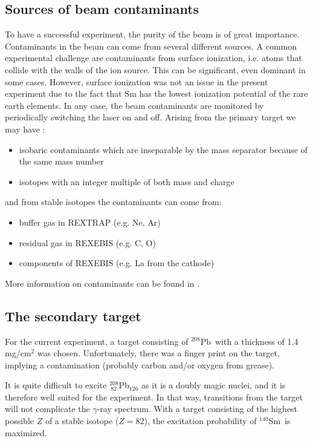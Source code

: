 \documentclass[twoside,english]{uiofysmaster/uiofysmaster}
\newcommand{\Sm}{$^{140}$Sm} %
\newcommand{\Pb}{$^{208}$Pb}
\newcommand{\ga}{$\gamma$}
\begin{document}
\subsection{Sources of beam contaminants}\label{ssec:bcontaminants}
To have a successful experiment, the purity of the beam is of great importance. Contaminants in the beam can come from several different sources. 
A common experimental challenge are contaminants from surface ionization, i.e. atoms that collide with the walls of the ion source. 
This can be significant, even dominant in some cases. 
However, surface ionization was not an issue in the present experiment due to the fact that Sm has the lowest ionization potential of the rare earth elements. 
In any case, the beam contaminants are monitored by periodically switching the laser on and off.
Arising from the primary target we may have \cite{MB-spect}:
\begin{itemize}
	\item isobaric contaminants which are inseparable by the mass separator because of the same mass number
	\item isotopes with an integer multiple of both mass and charge
\end{itemize}
and from stable isotopes the contaminants can come from:
\begin{itemize}
	\item buffer gas in REXTRAP (e.g. Ne, Ar)
	\item residual gas in REXEBIS (e.g. C, O)
	\item components of REXEBIS (e.g. La from the cathode)
\end{itemize}
More information on contaminants can be found in \cite{HIE-ISOLDE, RILIS, MB-spect}.


\subsection{The secondary target}\label{ssec:Pb}
For the current experiment, a target consisting of \Pb\ with a thickness of 1.4 mg/cm$^2$ was chosen. 
Unfortunately, there was a finger print on the target, implying a contamination (probably carbon and/or oxygen from grease).

It is quite difficult to excite $^{208}_{~82}$Pb$_{126}$ as it is a doubly magic nuclei, and it is therefore well suited for the experiment. 
In that way, transitions from the target will not complicate the \ga-ray spectrum.
With a target consisting of the highest possible $Z$ of a stable isotope ($Z = 82$), the excitation probability of \Sm\ is maximized. 
\end{document}
